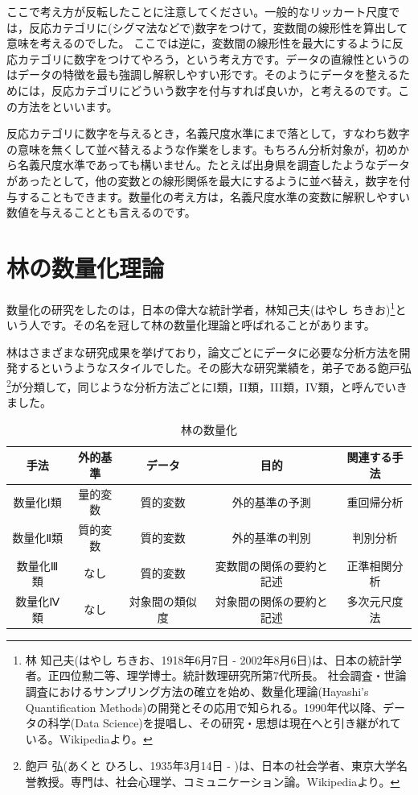 \documentclass{ltjsbook}
\begin{document}
ここで考え方が反転したことに注意してください。一般的なリッカート尺度では，反応カテゴリに(シグマ法などで)数字をつけて，変数間の線形性を算出して意味を考えるのでした。
ここでは逆に，変数間の線形性を最大にするように反応カテゴリに数字をつけてやろう，という考え方です。データの直線性というのはデータの特徴を最も強調し解釈しやすい形です。そのようにデータを整えるためには，反応カテゴリにどういう数字を付与すれば良いか，と考えるのです。この方法をといいます。

反応カテゴリに数字を与えるとき，名義尺度水準にまで落として，すなわち数字の意味を無くして並べ替えるような作業をします。もちろん分析対象が，初めから名義尺度水準であっても構いません。たとえば出身県を調査したようなデータがあったとして，他の変数との線形関係を最大にするように並べ替え，数字を付与することもできます。数量化の考え方は，名義尺度水準の変数に解釈しやすい数値を与えることとも言えるのです。

\section{林の数量化理論}
数量化の研究をしたのは，日本の偉大な統計学者，林知己夫(はやし ちきお)\footnote{林 知己夫(はやし ちきお、1918年6月7日 - 2002年8月6日)は、日本の統計学者。正四位勲二等、理学博士。統計数理研究所第7代所長。 社会調査・世論調査におけるサンプリング方法の確立を始め、数量化理論(Hayashi's Quantification Methods)の開発とその応用で知られる。1990年代以降、データの科学(Data Science)を提唱し、その研究・思想は現在へと引き継がれている。Wikipediaより。}という人です。その名を冠して林の数量化理論と呼ばれることがあります。

林はさまざまな研究成果を挙げており，論文ごとにデータに必要な分析方法を開発するというようなスタイルでした。その膨大な研究業績を，弟子である飽戸弘\footnote{飽戸 弘(あくと ひろし、1935年3月14日 - )は、日本の社会学者、東京大学名誉教授。専門は、社会心理学、コミュニケーション論。Wikipediaより。}が分類して，同じような分析方法ごとにI類，II類，III類，IV類，と呼んでいきました。

\begin{table}[h]
    \caption{林の数量化}
    \begin{tabular}{c|c|c|c|c}
        手法    & 外的基準 & データ     & 目的           & 関連する手法 \\
        \hline
        数量化Ⅰ類 & 量的変数 & 質的変数    & 外的基準の予測      & 重回帰分析  \\
        数量化Ⅱ類 & 質的変数 & 質的変数    & 外的基準の判別      & 判別分析   \\
        数量化Ⅲ類 & なし   & 質的変数    & 変数間の関係の要約と記述 & 正準相関分析 \\
        数量化Ⅳ類 & なし   & 対象間の類似度 & 対象間の関係の要約と記述 & 多次元尺度法 \\
    \end{tabular}
    \label{tbl::14_03}
\end{table}
\end{document}
